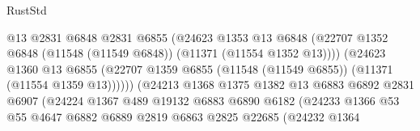 \begin{lexlean}{RustStd}
\begin{coremodule}
                                          @13
                                          @2831
                                          @6848
                                          @2831
                                          @6855
                                          (@24623
                                            @1353
                                            @13
                                            @6848
                                            (@22707
                                              @1352
                                              @6848
                                              (@11548 (@11549 @6848))
                                              (@11371 (@11554 @1352 @13))))
                                          (@24623
                                            @1360
                                            @13
                                            @6855
                                            (@22707
                                              @1359
                                              @6855
                                              (@11548 (@11549 @6855))
                                              (@11371 (@11554 @1359 @13))))))
                                      (@24213
                                        @1368
                                        @1375
                                        @1382
                                        @13
                                        @6883
                                        @6892
                                        @2831
                                        @6907
                                        (@24224
                                          @1367
                                          @489
                                          @19132
                                          @6883
                                          @6890
                                          @6182
                                          (@24233
                                            @1366
                                            @53
                                            @55
                                            @4647
                                            @6882
                                            @6889
                                            @2819
                                            @6863
                                            @2825
                                            @22685
                                            (@24232
                                              @1364

\end{coremodule}
\end{lexlean}
